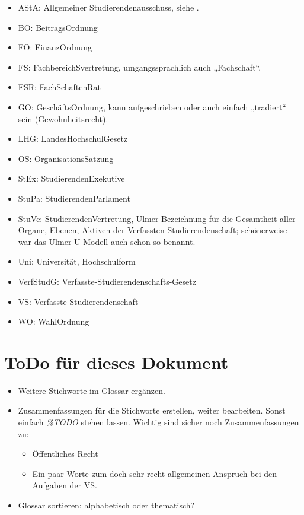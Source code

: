 \documentclass[
10pt,
a4paper,
twoside,								%
titlepage=false,							%
draft=false								%
]{scrartcl}
\begin{document}
\begin{itemize}
	\item AStA: Allgemeiner Studierendenausschuss, siehe .
	\item BO: BeitragsOrdnung
	\item FO: FinanzOrdnung
	\item FS: FachbereichSvertretung, umgangssprachlich auch „Fachschaft“.
	\item FSR: FachSchaftenRat
	\item GO: GeschäftsOrdnung, kann aufgeschrieben oder auch einfach „tradiert“ sein (Gewohnheitsrecht).
	\item LHG: LandesHochschulGesetz
	\item OS: OrganisationsSatzung
	\item StEx: StudierendenExekutive
	\item StuPa: StudierendenParlament
	\item StuVe: StudierendenVertretung, Ulmer Bezeichnung für die Gesamtheit aller Organe, Ebenen, Aktiven der Verfassten Studierendenschaft; schönerweise war das Ulmer \href{https://de.wikipedia.org/wiki/Unabh\%C3\%A4ngige_Studierendenschaft}{U-Modell} auch schon so benannt.
	\item Uni: Universität, Hochschulform
	\item VerfStudG: Verfasste-Studierendenschafts-Gesetz
	\item VS: Verfasste Studierendenschaft
	\item WO: WahlOrdnung
\end{itemize}

\section*{ToDo für dieses Dokument}

\begin{itemize}
	\item Weitere Stichworte im Glossar ergänzen.
	\item Zusammenfassungen für die Stichworte erstellen, weiter bearbeiten. Sonst einfach \textit{\%TODO} stehen lassen. Wichtig sind sicher noch Zusammenfassungen zu:
	\begin{itemize}
		\item Öffentliches Recht
		\item Ein paar Worte zum doch sehr recht allgemeinen Anspruch bei den Aufgaben der VS.
	\end{itemize}
	\item Glossar sortieren: alphabetisch oder thematisch?
\end{itemize}
\end{document}
